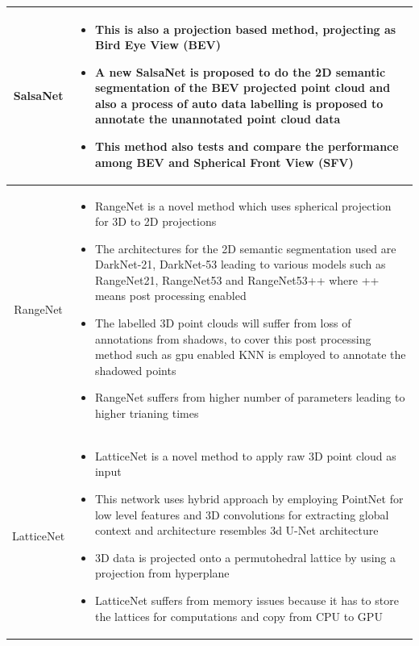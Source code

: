 \documentclass[12pt]{article}
\begin{document}
\begin{longtable}{|c|L|}
       SalsaNet \cite{salsanet} & \begin{itemize}
           \item This is also a projection based method, projecting as Bird Eye View (BEV)
           \item A new SalsaNet is proposed to do the 2D semantic segmentation of the BEV projected point cloud and also a process of auto data labelling is proposed to annotate the unannotated point cloud data
           \item This method also tests and compare the performance among BEV and Spherical Front View (SFV)
       \end{itemize} \\ \hline
       
      
       RangeNet \cite{Rangenet} & \begin{itemize}
           \item RangeNet is a novel method which uses spherical projection for 3D to 2D projections
           \item The architectures for the 2D semantic segmentation used are DarkNet-21, DarkNet-53 leading to various models such as RangeNet21, RangeNet53 and RangeNet53++ where ++ means post processing enabled
           \item The labelled 3D point clouds will suffer from loss of annotations from shadows, to cover this post processing method such as gpu enabled KNN is employed to annotate the shadowed points
           \item RangeNet suffers from higher number of parameters leading to higher trianing times
       \end{itemize} \\ \hline
       
       LatticeNet \cite{004} & \begin{itemize}
           \item LatticeNet is a novel method to apply raw 3D point cloud as input
           \item This network uses hybrid approach by employing PointNet for low level features and 3D convolutions for extracting global context and architecture resembles 3d U-Net architecture
           \item 3D data is projected onto a permutohedral lattice by using a projection from hyperplane
           \item LatticeNet suffers from memory issues because it has to store the lattices for computations and copy from CPU to GPU
       \end{itemize} \\ \hline
       

\end{longtable}
\end{document}
